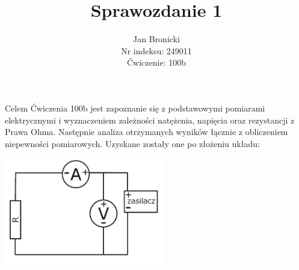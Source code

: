 \documentclass{article}
\title{Sprawozdanie 1}
\author{Jan Bronicki \\
Nr indeksu: 249011\\
Ćwiczenie: 100b}
\date{}
\begin{document}
\maketitle
\begin{flushleft}
    Celem Ćwiczenia 100b jest zapoznanie się z podstawowymi 
    pomiarami elektrycznymi i wyznaczeniem zależności natężenia,
    napięcia oraz rezystancji z Prawa Ohma.
    Następnie analiza otrzymanych wyników łącznie z obliczeniem
    niepewności pomiarowych. Uzyskane zostały one po złożeniu 
    układu: 
\end{flushleft}
\begin{center}
    \includegraphics[width=7cm]{graph1.png} 
\end{center}
\end{document}
